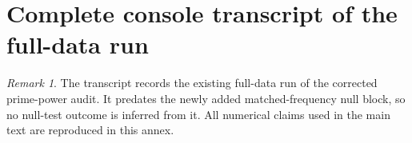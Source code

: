\documentclass[11pt]{amsart}
\numberwithin{equation}{section}
\theoremstyle{plain}
\theoremstyle{definition}
\theoremstyle{remark}
\newtheorem{remark}[theorem]{Remark}
\newcommand{\1}{\mathbf{1}}
\begin{document}


\section{Complete console transcript of the full-data run}
\label{app:console_output}

\begin{remark}
The transcript records the existing full-data run of the corrected
prime-power audit.  It predates the newly added matched-frequency null block,
so no null-test outcome is inferred from it.  All numerical claims used in the
main text are reproduced in this annex.
\end{remark}


\end{document}

